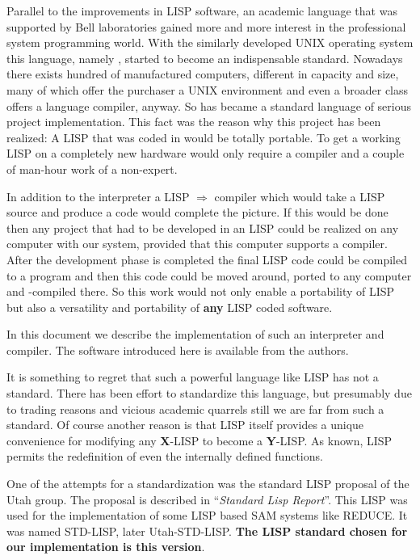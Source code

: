 Parallel to the improvements in  LISP software, an academic  language  that
was  supported  by  Bell  laboratories  gained  more and more interest in the
professional system programming world. With the  similarly  developed  UNIX
operating   system   this   language,  namely  \C,  started  to  become  an
indispensable standard.  Nowadays  there  exists  hundred  of  manufactured
computers, different  in  capacity  and  size,  many  of  which  offer  the
purchaser  a UNIX environment and even a broader class offers a \C language
compiler, anyway. So \C has became a standard language of  serious  project
implementation. This fact was the reason why this project has been realized:
A  LISP  that  was  coded in \C would be totally portable. To get a working
LISP on a completely new hardware would only require a \C  compiler  and  a
couple of man-hour work of a non-expert.

In addition to the interpreter a LISP $\Rightarrow$ \C compiler which would
take  a  LISP  source  and produce a \C code would complete the picture. If
this would be done then any project that had to be  developed  in  an  LISP
could  be  realized  on  any  computer  with our system, provided that this
computer supports a \C compiler. After the development  phase  is  completed
the final LISP code could be compiled to a \C program and then this \C code
could  be  moved  around, ported to any computer and \CC-compiled there. So
this work  would  not  only  enable  a  portability  of  LISP  but  also  a
versatility and portability of {\bf any} LISP coded software.

In  this document we describe the implementation of such an interpreter and
compiler. The software introduced here is available from the authors.

It is something to regret that such a powerful language like LISP has not a
standard.  There  has  been  effort  to  standardize  this  language,   but
presumably  due  to  trading reasons and vicious academic quarrels still we
are far from such a standard. Of course another reason is that LISP  itself
provides a unique convenience for modifying any {\bf X}-LISP  to  become  a
{\bf  Y}-LISP.  As  known,  LISP  permits  the  redefinition  of  even  the
internally defined functions.

One of the attempts for a standardization was the standard LISP proposal of
the Utah group. The proposal is described in
``{\em Standard Lisp Report}''\cite{std}.
This  LISP  was
used  for the implementation of some LISP based SAM systems like REDUCE. It
was  named  STD-LISP,  later  Utah-STD-LISP. {\bf The LISP standard chosen
for our implementation is this version}.

